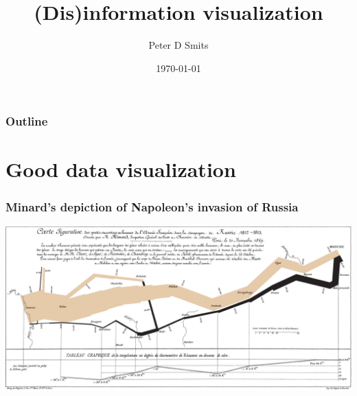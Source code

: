 \documentclass{beamer}
\title{(Dis)information visualization}
\author{Peter D Smits}
\institute{Committee on Evolutionary Biology \\
University of Chicago}
\date{\today}
\begin{document}
\begin{frame}
  \maketitle
\end{frame}

\begin{frame}
  \frametitle{Outline}
  \tableofcontents
\end{frame}

\section{Good data visualization}
\begin{frame}
  \frametitle{Minard's depiction of Napoleon's invasion of Russia}
  \includegraphics[width = \textwidth, keepaspectratio = true]{figure/minard}
\end{frame}
\end{document}
